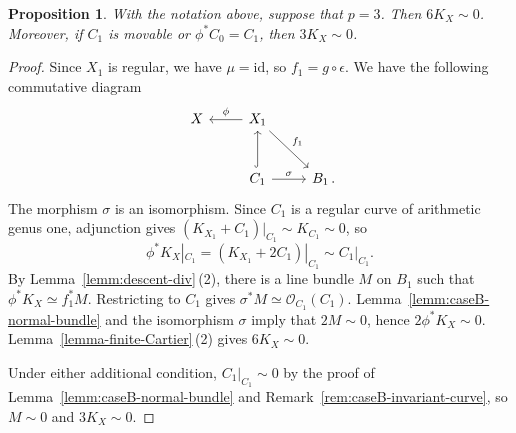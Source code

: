\documentclass[10pt,abstract=true]{scrartcl}
\numberwithin{equation}{section}
\newtheorem{proposition}[theorem]{Proposition}
\theoremstyle{definition}
\theoremstyle{remark}
\begin{document}
\begin{proposition}\label{prop:caseB-torsion-p3}
  With the notation above, suppose that $p=3$.
  Then $6K_X\sim0$.
  Moreover, if $C_1$ is movable or $\phi^*C_0=C_1$, then $3K_X\sim0$.
\end{proposition}

\begin{proof}
	Since $X_1$ is regular, we have $\mu=\mathrm{id}$, so $f_1=g\circ\epsilon$. We have the following commutative diagram
	\begin{equation*}
		\begin{tikzcd}[row sep=normal]
			X & X_1 \ar[l,"\phi"']\ar[dr,"f_1"] \\[2ex]
			&C_1\ar[u,hook]\ar[r,"\sigma"] & B_1\rlap{\,.}
		\end{tikzcd}
	\end{equation*}
  The morphism $\sigma$ is an isomorphism.
  Since $C_1$ is a regular curve of arithmetic genus one, adjunction gives $(K_{X_1}+C_1)|_{C_1}\sim K_{C_1}\sim0$, so
	\[
	\phi^*K_X|_{C_1} =(K_{X_1}+2C_1)|_{C_1} \sim C_1|_{C_1}.
	\]
  By Lemma~\ref{lemm:descent-div}\,\textup{(2)}, there is a line bundle $M$ on $B_1$ such that $\phi^*K_X\simeq f_1^*M$.
  Restricting to $C_1$ gives $\sigma^*M\simeq\mathcal O_{C_1}(C_1)$.
  Lemma~\ref{lemm:caseB-normal-bundle} and the isomorphism $\sigma$ imply that $2M\sim0$, hence $2\phi^*K_X\sim0$.
  Lemma~\ref{lemma-finite-Cartier}\,\textup{(2)} gives $6K_X\sim0$.

  Under either additional condition, $C_1|_{C_1}\sim0$ by the proof of Lemma~\ref{lemm:caseB-normal-bundle} and Remark~\ref{rem:caseB-invariant-curve}, so $M\sim0$ and $3K_X\sim0$.
\end{proof}
\end{document}
